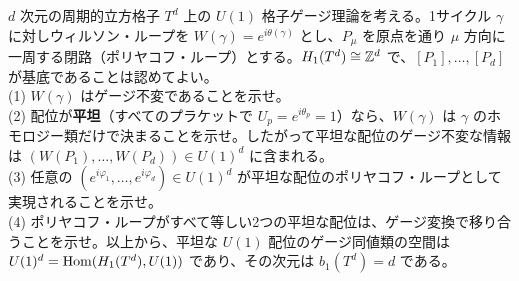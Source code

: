 \begin{problem}[難易度 C]\label{ch04-prob-polyakov}
$d$ 次元の周期的立方格子 $T^d$ 上の $U(1)$ 格子ゲージ理論を考える。1サイクル $\gamma$ に対しウィルソン・ループを $W(\gamma)=e^{i\theta(\gamma)}$ とし、$P_\mu$ を原点を通り $\mu$ 方向に一周する閉路（ポリヤコフ・ループ）とする。$H_1(T^d)\cong\mathbb{Z}^d$ で、$[P_1],\dots,[P_d]$ が基底であることは認めてよい。\\
(1) $W(\gamma)$ はゲージ不変であることを示せ。\\
(2) 配位が\textbf{平坦}（すべてのプラケットで $U_p=e^{i\theta_p}=1$）なら、$W(\gamma)$ は $\gamma$ のホモロジー類だけで決まることを示せ。したがって平坦な配位のゲージ不変な情報は $(W(P_1),\dots,W(P_d))\in U(1)^d$ に含まれる。\\
(3) 任意の $(e^{i\varphi_1},\dots,e^{i\varphi_d})\in U(1)^d$ が平坦な配位のポリヤコフ・ループとして実現されることを示せ。\\
(4) ポリヤコフ・ループがすべて等しい2つの平坦な配位は、ゲージ変換で移り合うことを示せ。以上から、平坦な $U(1)$ 配位のゲージ同値類の空間は $U(1)^d=\operatorname{Hom}(H_1(T^d),U(1))$ であり、その次元は $b_1(T^d)=d$ である。
\end{problem}

